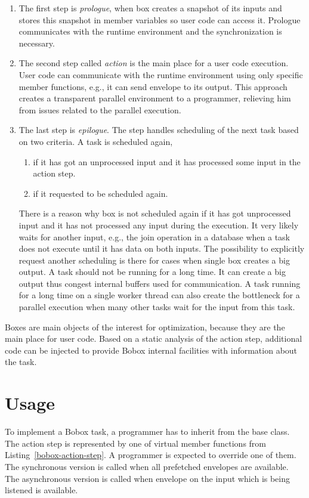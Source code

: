 \begin{enumerate}
\item The first step is \emph{prologue}, when box creates a snapshot of its inputs and stores this snapshot in member variables so user code can access it. Prologue communicates with the runtime environment and the synchronization is necessary.
\item The second step called \emph{action} is the main place for a user code execution. User code can communicate with the runtime environment using only specific member functions, e.g., it can send envelope to its output. This approach creates a transparent parallel environment to a programmer, relieving him from issues related to the parallel execution.
\item The last step is \emph{epilogue}. The step handles scheduling of the next task based on two criteria. A task is scheduled again,

\begin{enumerate}
\item if it has got an unprocessed input and it has processed some input in the action step.
\item if it requested to be scheduled again.
\end{enumerate}

There is a reason why box is not scheduled again if it has got unprocessed input and it has not processed any input during the execution. It very likely waits for another input, e.g., the join operation in a database when a task does not execute until it has data on both inputs. The possibility to explicitly request another scheduling is there for cases when single box creates a big output. A task should not be running for a long time. It can create a big output thus congest internal buffers used for communication. A task running for a long time on a single worker thread can also create the bottleneck for a parallel execution when many other tasks wait for the input from this task.

\end{enumerate}

Boxes are main objects of the interest for optimization, because they are the main place for user code. Based on a static analysis of the action step, additional code can be injected to provide Bobox internal facilities with information about the task.

\section{Usage}
\label{bobox-usage}
To implement a Bobox task, a programmer has to inherit from the  base class. The action step is represented by one of virtual member functions from Listing~\ref{bobox-action-step}. A programmer is expected to override one of them. The synchronous version is called when all prefetched envelopes are available. The asynchronous version is called when envelope on the input which is being listened is available.

